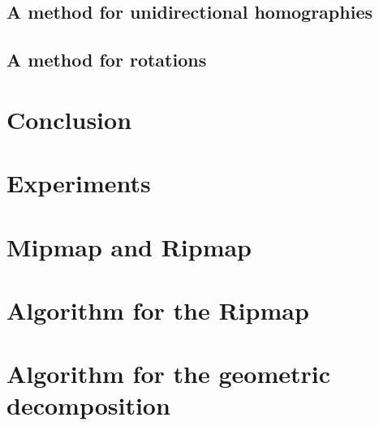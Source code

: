 \documentclass[a4paper,11pt]{article}
\theoremstyle{plain}
\theoremstyle{definition}
\theoremstyle{remark}
\begin{document}
		\subsection{A method for unidirectional homographies}
			\label{HomoboxRipmap}
		\subsection{A method for rotations}
			\label{YaroSzeli}
	\clearpage
	\section*{Conclusion}
			
	\clearpage
	\section{Experiments}
		\label{experiences}
		
		
		
		
	\clearpage
	\appendix
	\section{Mipmap and Ripmap}
           \label{Mipmap_pseudo_code_jt}
	\label{pseudo_code}
	\section{Algorithm for the Ripmap}
                     \label{Ripmap_pseudo_code_jt}
	\section{Algorithm for the geometric decomposition}
		
	\nocite{*}
	
	
\end{document}

